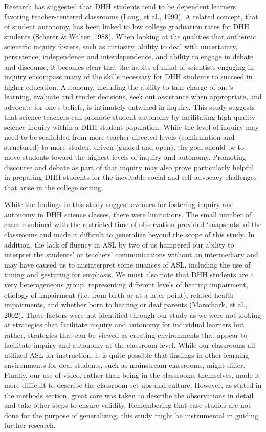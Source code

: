 \documentclass[11.5pt]{sig-alternate} %
\begin{document}
\begin{large}
Research has suggested that DHH students tend to be dependent learners favoring teacher-centered classrooms (Lang, et al., 1999).  A related concept, that of student autonomy, has been linked to low college graduation rates for DHH students (Scherer \& Walter, 1988). When looking at the qualities that authentic scientific inquiry fosters, such as curiosity, ability to deal with uncertainty, persistence, independence and interdependence, and ability to engage in debate and discourse, it becomes clear that the habits of mind of scientists engaging in inquiry encompass many of the skills necessary for DHH students to succeed in higher education.  Autonomy, including the ability to take charge of one’s learning, evaluate and render decisions, seek out assistance when appropriate, and advocate for one’s beliefs, is intimately entwined in inquiry. This study suggests that science teachers can promote student autonomy by facilitating high quality science inquiry within a DHH student population.  While the level of inquiry may need to be scaffolded from more teacher-directed levels (confirmation and structured) to more student-driven (guided and open), the goal should be to move students toward the highest levels of inquiry and autonomy. Promoting discourse and debate as part of that inquiry may also prove particularly helpful in preparing DHH students for the inevitable social and self-advocacy challenges that arise in the college setting.  

While the findings in this study suggest avenues for fostering inquiry and autonomy in DHH science classes, there were limitations.  The small number of cases combined with the restricted time of observation provided ‘snapshots’ of the classrooms and made it difficult to generalize beyond the scope of this study.  In addition, the lack of fluency in ASL by two of us hampered our ability to interpret the students’ or teachers’ communications without an intermediary and may have caused us to misinterpret some nuances of ASL, including the use of timing and gesturing for emphasis.  We must also note that DHH students are a very heterogeneous group, representing different levels of hearing impairment, etiology of impairment (i.e. from birth or at a later point), related health impairments, and whether born to hearing or deaf parents (Marschark, et al., 2002).  These factors were not identified through our study as we were not looking at strategies that facilitate inquiry and autonomy for individual learners but rather, strategies that can be viewed as creating environments that appear to facilitate inquiry and autonomy at the classroom level. While our classrooms all utilized ASL for instruction, it is quite possible that findings in other learning environments for deaf students, such as mainstream classrooms, might differ.  Finally, our use of video, rather than being in the classrooms themselves, made it more difficult to describe the classroom set-ups and culture.  However, as stated in the methods section, great care was taken to describe the observations in detail and take other steps to ensure validity.  Remembering that case studies are not done for the purpose of generalizing, this study might be instrumental in guiding further research. 


\end{large}
\end{document}
